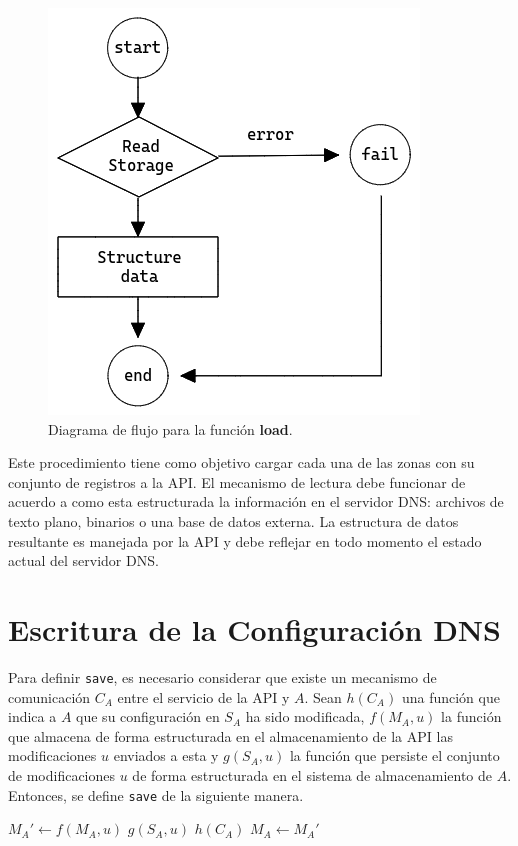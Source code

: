 \begin{figure}[!ht]
    \centering
    \includegraphics[width=0.5\linewidth]{draws/load.png}
    \caption{Diagrama de flujo para la función \textbf{load}.}
\end{figure}

Este procedimiento tiene como objetivo cargar cada una de las zonas con su conjunto de registros a la API. El mecanismo de lectura debe funcionar de acuerdo a como esta estructurada la información en el servidor DNS: archivos de texto plano, binarios o una base de datos externa. La estructura de datos resultante es manejada por la API y debe reflejar en todo momento el estado actual del servidor DNS.

\section{Escritura de la Configuración DNS}

Para definir \verb+save+, es necesario considerar que existe un mecanismo de comunicación $C_A$ entre el servicio de la API y $A$. Sean $h(C_A)$ una función que indica a $A$ que su configuración en $S_A$ ha sido modificada, $f(M_A, u)$ la función que almacena de forma estructurada en el almacenamiento de la API las modificaciones $u$ enviados a esta y $g(S_A, u)$ la función que persiste el conjunto de modificaciones $u$ de forma estructurada en el sistema de almacenamiento de $A$. Entonces, se define \verb+save+ de la siguiente manera.

\begin{algorithmic}\label{proc:save}
    \State $M_A' \leftarrow f(M_A, u)$
    \State $g(S_A, u)$
    \State $h(C_A)$
    \State $M_A \leftarrow M_A'$
\EndProcedure
\end{algorithmic}


